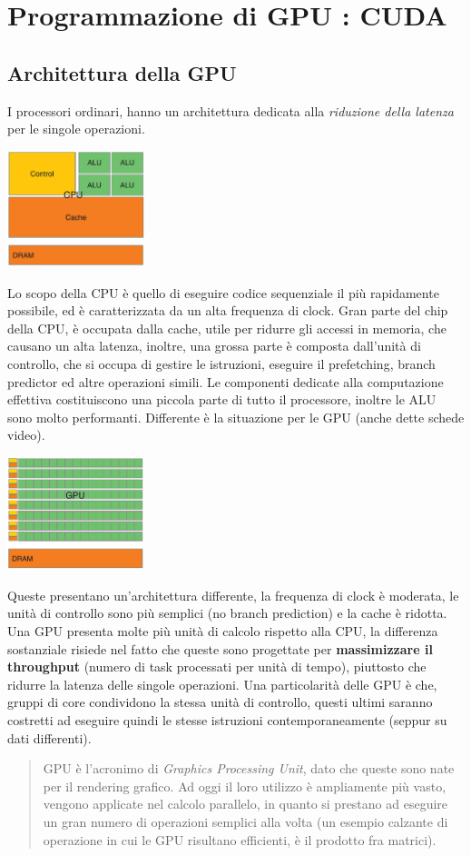 \documentclass[10pt, letterpaper]{report}
\begin{document}
\chapter{Programmazione di GPU : CUDA}
\section{Architettura della GPU}
I processori ordinari, hanno un architettura dedicata alla \textit{riduzione della latenza} per le singole operazioni.
\begin{center}
    \includegraphics[width=0.3\textwidth ]{images/cpu.png}
\end{center}
Lo scopo della CPU è quello di eseguire codice sequenziale  il più rapidamente possibile, ed è caratterizzata da un alta frequenza di clock. Gran parte del chip della CPU, è occupata dalla cache, utile per ridurre gli accessi in memoria, che causano un alta latenza, inoltre, una grossa parte è composta dall'unità di controllo, che si occupa di gestire le istruzioni, eseguire il prefetching, branch predictor ed altre operazioni simili. \acc 
Le componenti dedicate alla computazione effettiva costituiscono una piccola parte di tutto il processore, inoltre le ALU sono molto performanti. Differente è la situazione per le GPU (anche dette schede video).
\begin{center}
    \includegraphics[width=0.3\textwidth ]{images/GPU.png}
\end{center}
Queste presentano un'architettura differente, la frequenza di clock è moderata, le unità di controllo sono più semplici (no branch prediction) e la cache è ridotta. Una GPU presenta molte più unità di calcolo rispetto alla CPU, la differenza sostanziale risiede nel fatto che queste sono progettate per \textbf{massimizzare il throughput} (numero di task processati per unità di tempo), piuttosto che ridurre la latenza delle singole operazioni. \acc Una particolarità delle GPU è che, gruppi di core condividono la stessa unità di controllo, questi ultimi saranno costretti ad eseguire quindi le stesse istruzioni contemporaneamente (seppur su dati differenti).\begin{quote}
    GPU è l'acronimo di \textit{Graphics Processing Unit}, dato che queste sono nate per il rendering grafico. Ad oggi il loro utilizzo è ampliamente più vasto, vengono applicate nel calcolo parallelo, in quanto si prestano ad eseguire un gran numero di operazioni semplici alla volta (un esempio calzante di operazione in cui le GPU risultano efficienti, è il prodotto fra matrici).
\end{quote}
\end{document}
